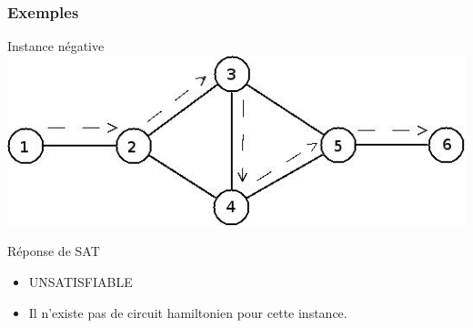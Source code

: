 \begin{frame}
\frametitle{Exemples}
\begin{block}{Instance n\'egative}
\includegraphics[scale=0.3]{negatif.jpeg}
\end{block}
\begin{block}{R\'eponse de SAT}
  \begin{itemize}
  \item UNSATISFIABLE
  \item Il n'existe pas de circuit hamiltonien pour cette instance.
  \end{itemize}
\end{block}
\end{frame}
